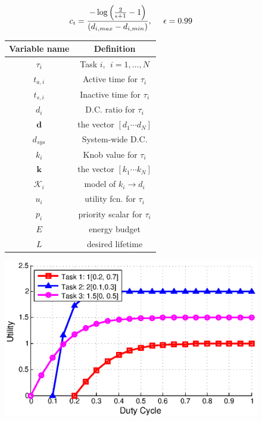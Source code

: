 \begin{equation}
c_i = { -\log\left( {2\over \epsilon + 1} - 1 \right) \over (d_{i,max} - d_{i,min}) }, ~~~~\epsilon = 0.99
\end{equation}

\begin{figure}[t]
\centering
{\centering
\begin{minipage}{0.47\textwidth}
  \centering

\centering
\begin{tabular}{c|c}
\hline
Variable name & Definition \\ \hline
$\tau_i$ & Task $i,~~i = 1,\ldots,N$ \\
$t_{a,i}$ & Active time for $\tau_i$ \\
$t_{s,i}$ & Inactive time for $\tau_i$ \\
$d_i$ & D.C. ratio for $\tau_i$ \\
$\pmb{d}$ & the vector $[d_1 \cdots d_N]$ \\
$d_{sys}$ & System-wide D.C. \\
$k_i$ & Knob value for $\tau_i$ \\
$\pmb{k}$ & the vector $[k_1 \cdots k_N]$ \\
$\mathcal{K}_i$ & model of $k_i \rightarrow d_i$ \\
$u_i$ & utility fcn. for $\tau_i$ \\
$p_i$ & priority scalar for $\tau_i$ \\
$E$ & energy budget \\
$L$ & desired lifetime \\ \hline
\end{tabular}

\end{minipage}
\hspace{.04\textwidth}
\begin{minipage}{0.47\textwidth}
  \centering
\includegraphics[width=\textwidth]{figures/utilityfunctions}
\end{minipage}
}
\end{figure}

